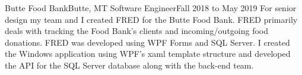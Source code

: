 

\experienceHeading
{Butte Food Bank}{Butte, MT}
{Software Engineer}{Fall 2018 to May 2019}
\experienceStart
        {For senior design my team and I created FRED for the Butte Food Bank. FRED primarily deals with tracking the Food Bank's clients and incoming/outgoing food donations.}
        {FRED was developed using WPF Forms and SQL Server. I created the Windows application using WPF's xaml template structure and developed the API for the SQL Server database along with the back-end team.}
\experienceEnd